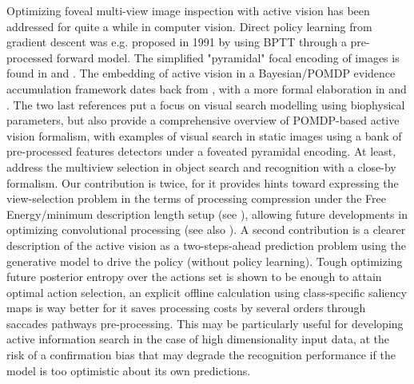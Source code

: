 \documentclass{article} %
\begin{document}
Optimizing foveal multi-view image inspection with active vision has been addressed for quite a while in computer vision. Direct policy learning from gradient descent was e.g. proposed in 1991 by \cite{schmidhuber1991learning} using BPTT through a pre-processed forward model. The simplified "pyramidal" focal encoding of images is found in \cite{kortum1996implementation,wang2003foveation} and \cite{chen2017eccentricity}. The embedding of active vision in a Bayesian/POMDP evidence accumulation framework dates back from \cite{bajcsy1988active}, with a more formal elaboration in \cite{najemnik2005optimal} and \cite{butko2010infomax}. The two last references put a focus on visual search modelling using biophysical parameters, but
\cite{butko2010infomax} also provide a comprehensive overview of POMDP-based active vision formalism, with examples of visual search in static images using a bank of pre-processed features detectors under a foveated pyramidal encoding. 
At least, \cite{potthast2016active} address the multiview selection in object search and recognition with a close-by formalism.
Our contribution is twice, for it provides hints toward expressing the view-selection problem in the terms of processing compression under the Free Energy/minimum description length setup (see \cite{hinton1994autoencoders}), allowing future developments in optimizing convolutional processing (see also \cite{louizos2017bayesian}). A second contribution is a clearer description of the active vision as a two-steps-ahead prediction problem using the generative model to drive the policy (without policy learning). Tough optimizing future posterior entropy over the actions set is shown to be enough to attain optimal action selection, an explicit offline calculation using class-specific saliency maps is way better for it saves processing costs by several orders through saccades pathways pre-processing.    
This may be particularly useful for developing active information search in the case of high dimensionality input data,
at the risk of a confirmation bias that may degrade the recognition performance if the model is too optimistic about its own predictions. 



\end{document}
